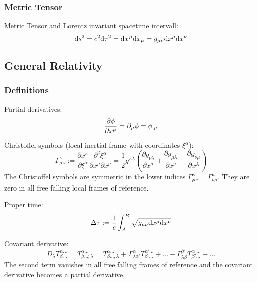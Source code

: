 	\subsubsection{Metric Tensor}
		Metric Tensor and Lorentz invariant spacetime intervall:
		\begin{equation}
			\mathrm{d} s^2 = c^2 \mathrm{d} \tau^2 = \mathrm{d} x^\mu \mathrm{d} x_\mu = g_{\mu\nu} \mathrm{d} x^\mu \mathrm{d} x^\nu
		\end{equation}

	\subsection{General Relativity}
		\subsubsection{Definitions}
			\noindent
			Partial derivatives:
			\begin{equation}
				\frac{\partial \phi}{\partial x^\mu} = \partial_\mu \phi = \phi_{,\mu}
			\end{equation}

			\noindent
			Christoffel symbols (local inertial frame with coordinates $\xi^\alpha$):
			\begin{equation}
				\Gamma_{\mu\nu}^{\kappa} := \frac{\partial x^\kappa}{\partial \xi^\alpha}\frac{\partial^2 \xi^\alpha}{\partial x^\mu\partial x^\nu}
				=\frac{1}{2}g^{\kappa\lambda}\left(\frac{\partial g_{\nu\lambda}}{\partial x^\mu}+\frac{\partial g_{\mu\lambda}}{\partial x^\nu}-\frac{\partial g_{\nu\mu}}{\partial x^\lambda}\right)
			\end{equation}
			The Christoffel symbols are symmetric in the lower indices $\Gamma_{\mu\nu}^{\kappa} = \Gamma_{\nu\mu}^{\kappa}$. They are zero in all free falling local frames of reference.

			\noindent
			Proper time:
			\begin{equation}
				\Delta\tau := \frac{1}{c}\int_A^B\sqrt{g_{\mu\nu}\mathrm{d} x^\mu \mathrm{d} x^\nu}
			\end{equation}

			\noindent
			Covariant derivative:
			\begin{equation}
				D_\lambda T^{\alpha ...}_{\beta...} =
				T^{\alpha ...}_{\beta...;\lambda} = T^{\alpha...}_{\beta ...,\lambda}
				+ \Gamma^\alpha_{\lambda\alpha'} T^{\alpha'...}_{\beta\phantom{\prime}...} + ...
				-\Gamma^{\beta'}_{\lambda\beta} T^{\alpha\phantom{\prime}...}_{\beta'...} - ...
			\end{equation}
			The second term vanishes in all free falling frames of reference and the covariant derivative becomes a partial derivative, %

